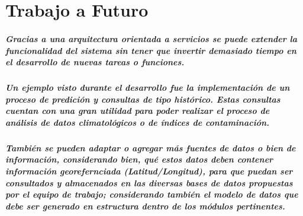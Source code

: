 \chapter {Trabajo a Futuro}
  \paragraph{Gracias a una arquitectura orientada a servicios se puede extender la funcionalidad del sistema sin tener que invertir demasiado tiempo en el desarrollo de nuevas tareas o funciones.}
  \paragraph{Un ejemplo visto durante el desarrollo fue la implementación de un proceso de predición y consultas de tipo histórico. Estas consultas cuentan con una gran utilidad para poder realizar el proceso de análisis de datos climatológicos o de índices de contaminación.}
  \paragraph{También se pueden adaptar o agregar más fuentes de datos o bien de información, considerando bien, qué estos datos deben contener información georefernciada (Latitud/Longitud), para que puedan ser consultados y almacenados en las diversas bases de datos propuestas por el equipo de trabajo; considerando también el modelo de datos que debe ser generado en estructura dentro de los módulos pertinentes.}
  